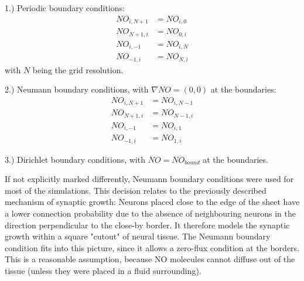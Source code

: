\documentclass[10pt,a4paper]{article}
\begin{document}
1.) Periodic boundary conditions:
\begin{align}
NO_{i,N+1} &= NO_{i,0} \label{Periodic_Cond_1} \\
NO_{N+1,i} &= NO_{0,i} \label{Periodic_Cond_2} \\
NO_{i,-1} &= NO_{i,N} \label{Periodic_Cond_3} \\
NO_{-1,i} &= NO_{N,i} \label{Periodic_Cond_4}
\end{align}
with $N$ being the grid resolution.

2.) Neumann boundary conditions, with $\nabla NO = (0,0)$ at the boundaries:
\begin{align}
NO_{i,N+1} &= NO_{i,N-1} \label{Neumann_Cond_1} \\
NO_{N+1,i} &= NO_{N-1,i} \label{Neumann_Cond_2} \\
NO_{i,-1} &= NO_{i,1} \label{Neumann_Cond_3} \\
NO_{-1,i} &= NO_{1,i} \label{Neumann_Cond_4}
\end{align}

3.) Dirichlet boundary conditions, with $NO = NO_{bound}$ at the boundaries.

If not explicitly marked differently, Neumann boundary conditions were used for most of the simulations. This decision relates to the previously described mechanism of synaptic growth: Neurons placed close to the edge of the sheet have a lower connection probability due to the absence of neighbouring neurons in the direction perpendicular to the close-by border. It therefore models the synaptic growth within a square "cutout" of neural tissue. The Neumann boundary condition fits into this picture, since it allows a zero-flux condition at the borders. This is a reasonable assumption, because NO molecules cannot diffuse out of the tissue (unless they were placed in a fluid surrounding).
\end{document}
